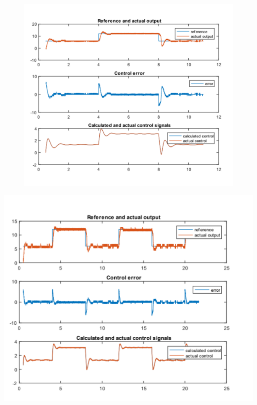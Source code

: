 \documentclass[11pt]{article}
\begin{document}
\begin{figure}[h!]
\includegraphics[scale=1]{Figures/3}
\end{figure}
\newpage
\includegraphics[scale=1]{Figures/4}
\end{document}
